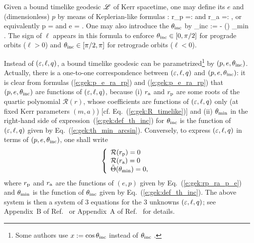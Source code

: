 Given a bound timelike geodesic $\mathscr{L}$ of Kerr spacetime, one may define
its  $e$ and (dimensionless)
 $p$ by means of Keplerian-like formulas \cite{Schmi02,DrascH06,SteinW20}:
\be \label{e:gek:rp_ra_p_e}
    r_{\rm p} =:  \qquad\mbox{and}\qquad
    r_{\rm a} =:  ,
\ee
or equivalently
\be \label{e:gek:p_e_ra_rp}
    p = 
    \qquad\mbox{and}\qquad
    e =  .
\ee
One may also introduce the  $\theta_{\rm inc}$ by
\be \label{e:gek:def_th_inc}
    \th_{\rm inc} :=  - (\ell) \th_{\rm min} .
\ee
The sign of $\ell$ appears in this formula to enforce $\theta_{\rm inc} \in [0, \pi/2]$
for prograde orbits ($\ell > 0$) and $\theta_{\rm inc} \in [\pi/2, \pi]$ for retrograde
orbits ($\ell < 0$).

Instead of $(\varepsilon,\ell,q)$, a bound timelike geodesic
can be parametrized\footnote{Some authors use $x:=\cos\theta_{\rm inc}$
instead of $\theta_{\rm inc}$ \cite{SteinW20}.}
by $(p, e, \theta_{\rm inc})$. Actually, there is a one-to-one
correspondence between $(\varepsilon,\ell,q)$ and $(p, e, \theta_{\rm inc})$:
it is clear from formulas (\ref{e:gek:p_e_ra_rp}) and (\ref{e:gek:p_e_ra_rp})
that $(p, e, \theta_{\rm inc})$ are functions of $(\varepsilon,\ell,q)$, because
(i) $r_{\rm a}$ and $r_{\rm p}$ are some roots of the quartic polynomial
$\mathcal{R}(r)$, whose coefficients are functions of $(\varepsilon,\ell,q)$ only
(at fixed Kerr parameters $(m, a)$) [cf. Eq.~(\ref{e:gek:R_timelike})] and
(ii) $\theta_{\rm min}$ in the right-hand side of expression~(\ref{e:gek:def_th_inc}) for
$\theta_{\rm inc}$ is the function of $(\varepsilon,\ell,q)$ given by Eq.~(\ref{e:gek:th_min_arcsin}).
Conversely, to express $(\varepsilon,\ell,q)$ in terms of $(p, e, \theta_{\rm inc})$,
one shall write
\[
    \left\{ \begin{array}{l}
        \mathcal{R}(r_{\rm p}) = 0 \\
        \mathcal{R}(r_{\rm a}) = 0 \\
        \tilde{\Theta}(\theta_{\rm min}) = 0 ,
        \end{array} \right.
\]
where $r_{\rm p}$ and $r_{\rm a}$ are the functions of $(e,p)$ given
by Eq.~(\ref{e:gek:rp_ra_p_e}) and $\theta_{\rm min}$ is the function
of $\theta_{\rm inc}$ given by Eq.~(\ref{e:gek:def_th_inc}). The above system
is then a system of 3 equations for the 3 unknowns $(\varepsilon,\ell,q)$; see
Appendix~B of Ref.~\cite{Schmi02} or Appendix~A of Ref.~\cite{DrascH06} for details.

